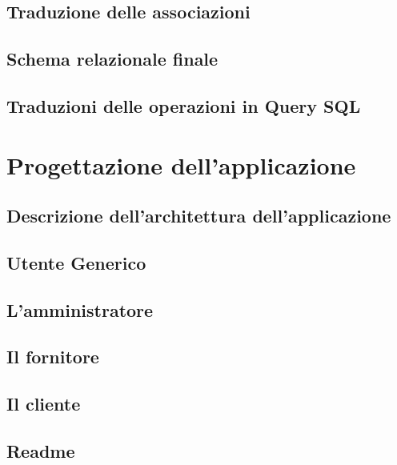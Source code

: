 \documentclass{article}
\begin{document}
\subsection{Traduzione delle associazioni}



\subsection{Schema relazionale finale}


\subsection{Traduzioni delle operazioni in Query SQL}




\section{Progettazione dell'applicazione}
\subsection{Descrizione dell'architettura dell'applicazione}
 

\subsection{Utente Generico}


\subsection{L'amministratore}


\subsection{Il fornitore}


\subsection{Il cliente}


\subsection{Readme}

\end{document}
